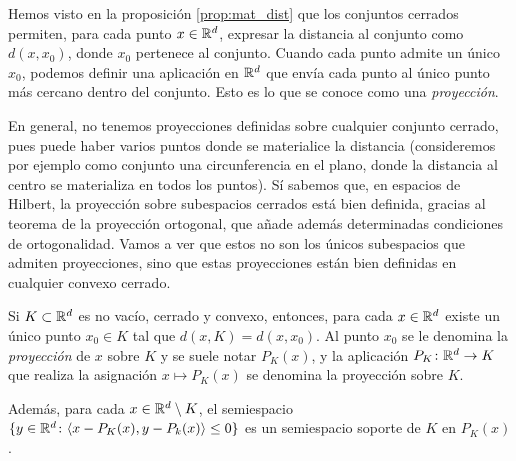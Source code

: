 Hemos visto en la proposición \ref{prop:mat_dist} que los conjuntos cerrados permiten, para cada punto $x \in \mathbb{R}^d$, expresar la distancia al conjunto como $d(x,x_0)$, donde $x_0$ pertenece al conjunto. Cuando cada punto admite un único $x_0$, podemos definir una aplicación en $\mathbb{R}^d$ que envía cada punto al único punto más cercano dentro del conjunto. Esto es lo que se conoce como una \emph{proyección}.

En general, no tenemos proyecciones definidas sobre cualquier conjunto cerrado, pues puede haber varios puntos donde se materialice la distancia (consideremos por ejemplo como conjunto una circunferencia en el plano, donde la distancia al centro se materializa en todos los puntos). Sí sabemos que, en espacios de Hilbert, la proyección sobre subespacios cerrados está bien definida, gracias al teorema de la proyección ortogonal, que añade además determinadas condiciones de ortogonalidad. Vamos a ver que estos no son los únicos subespacios que admiten proyecciones, sino que estas proyecciones están bien definidas en cualquier convexo cerrado.

\begin{thm} \label{thm:convex_projection}
    Si $K \subset \mathbb{R}^d$ es no vacío, cerrado y convexo, entonces, para cada $x \in \mathbb{R}^d$ existe un único punto $x_0 \in K$ tal que $d(x,K) = d(x,x_0)$. Al punto $x_0$ se le denomina la \emph{proyección} de $x$ sobre $K$ y se suele notar $P_K(x)$, y la aplicación $P_K \colon \mathbb{R}^d \to K$ que realiza la asignación $x \mapsto P_K(x)$ se denomina la proyección sobre $K$.

    Además, para cada $x \in \mathbb{R}^d \setminus K$, el semiespacio $\{y \in \mathbb{R}^d \colon \langle x - P_K(x), y - P_k(x) \rangle \le 0 \}$ es un semiespacio soporte de $K$ en $P_K(x)$.
\end{thm}

